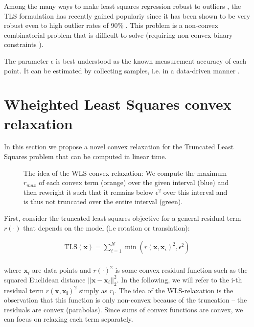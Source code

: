 Among the many ways to make least squares regression robust to outliers \cite[Ch. 3]{elements-of-stats-learning-book}, the TLS formulation has recently gained populariy \cite{Yang20tro-teaser, 9785843, NIPS2017_9f53d83e, doi:10.1080/10618600.2017.1390471, NIPS2010_01882513} since it has been shown to be very robust even to high outlier rates of 90\% \cite{Yang20tro-teaser}.
This problem is a non-convex combinatorial problem that is difficult to solve (requiring non-convex binary constraints \cite{5459398}).

The parameter $\epsilon$ is best understood as the known measurement accuracy of each point. It can be estimated by collecting samples, i.e. in a data-driven manner \cite[p.8]{Chin2017TheMC}.


\section{Wheighted Least Squares convex relaxation}

In this section we propose a novel convex relaxation for the Truncated Least Squares problem that can be computed in linear time.

\begin{figure}[!ht]
	\centering
	\caption{The idea of the WLS convex relaxation: We compute the maximum $r_{max}$ of each convex term (orange) over the given interval (blue) and then reweight it such that it remains below $\epsilon^2$ over this interval and is thus not truncated over the entire interval (green).}
	\label{fig:wlsrelaxideawithrelax}
\end{figure}

First, consider the truncated least squares objective for a general residual term $r(\cdot)$ that depends on the model (i.e rotation or translation): 

\begin{equation}
	\label{eq:tls-scalar-for-wls}
	\begin{aligned}
		\text{TLS}(\mathbf{x}) = \sum_{i=1}^{N} \min \left(r(\mathbf{x}, \mathbf{x}_i)^2, \epsilon^2 \right)\\
	\end{aligned}
\end{equation}

where $\mathbf{x}_i$ are data points and $r(\cdot)^2$ is some convex residual function such as the squared Euclidean distance $||\mathbf{x} - \mathbf{x}_i||_2^2$. In the following, we will refer to the i-th residual term $r(\mathbf{x}, \mathbf{x_i})^2$ simply as $r_i$.
The idea of the WLS-relaxation is the observation that this function is only non-convex because of the truncation -- the residuals are convex (parabolas). Since sums of convex functions are convex, we can focus on relaxing each term separately.

